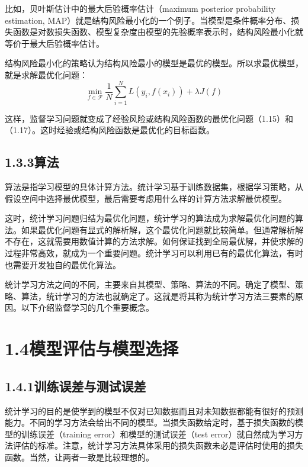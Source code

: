 \documentclass[UTF8,12pt,a4paper,fontset=fandol]{ctexart}
\begin{document}
比如，贝叶斯估计中的最大后验概率估计（maximum posterior probability estimation, MAP）就是结构风险最小化的一个例子。当模型是条件概率分布、损失函数是对数损失函数、模型复杂度由模型的先验概率表示时，结构风险最小化就等价于最大后验概率估计。

结构风险最小化的策略认为结构风险最小的模型是最优的模型。所以求最优模型，就是求解最优化问题：
\begin{equation}
  \min_{f\in\mathcal F}\frac1N\sum_{i=1}^N L(y_i,f(x_i))+\lambda J(f)
  \tag{1.17}
\end{equation}

这样，监督学习问题就变成了经验风险或结构风险函数的最优化问题（1.15）和（1.17）。这时经验或结构风险函数是最优化的目标函数。

\subsection*{1.3.3\quad 算法}

算法是指学习模型的具体计算方法。统计学习基于训练数据集，根据学习策略，从假设空间中选择最优模型，最后需要考虑用什么样的计算方法求解最优模型。

这时，统计学习问题归结为最优化问题，统计学习的算法成为求解最优化问题的算法。如果最优化问题有显式的解析解，这个最优化问题就比较简单。但通常解析解不存在，这就需要用数值计算的方法求解。如何保证找到全局最优解，并使求解的过程非常高效，就成为一个重要问题。统计学习可以利用已有的最优化算法，有时也需要开发独自的最优化算法。

统计学习方法之间的不同，主要来自其模型、策略、算法的不同。确定了模型、策略、算法，统计学习的方法也就确定了。这就是将其称为统计学习方法三要素的原因。以下介绍监督学习的几个重要概念。

\section*{1.4\quad 模型评估与模型选择}

\subsection*{1.4.1\quad 训练误差与测试误差}

统计学习的目的是使学到的模型不仅对已知数据而且对未知数据都能有很好的预测能力。不同的学习方法会给出不同的模型。当损失函数给定时，基于损失函数的模型的训练误差（training error）和模型的测试误差（test error）就自然成为学习方法评估的标准。注意，统计学习方法具体采用的损失函数未必是评估时使用的损失函数。当然，让两者一致是比较理想的。
\end{document}
